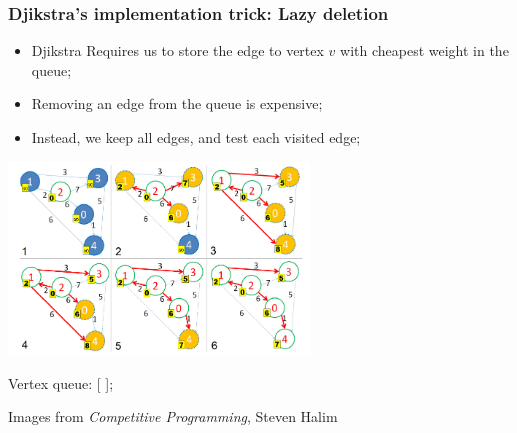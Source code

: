 \documentclass{beamer}
\begin{document}
\begin{frame}
  \frametitle{Djikstra's implementation trick: Lazy deletion}
  {\smaller
    \begin{itemize}
    \item Djikstra Requires us to store the edge to vertex $v$ with
      cheapest weight in the queue;
    \item Removing an edge from the queue is expensive;
    \item Instead, we keep all edges, and test each visited edge;
    \end{itemize}
  

  \begin{center}
    \includegraphics[width=0.6\textwidth]{../img/djikstra_halim}
  \end{center}

  Vertex queue: [
     ];}

  \vfill 

  \hfill {\tiny Images from \emph{Competitive Programming}, Steven Halim}
\end{frame}
\end{document}
